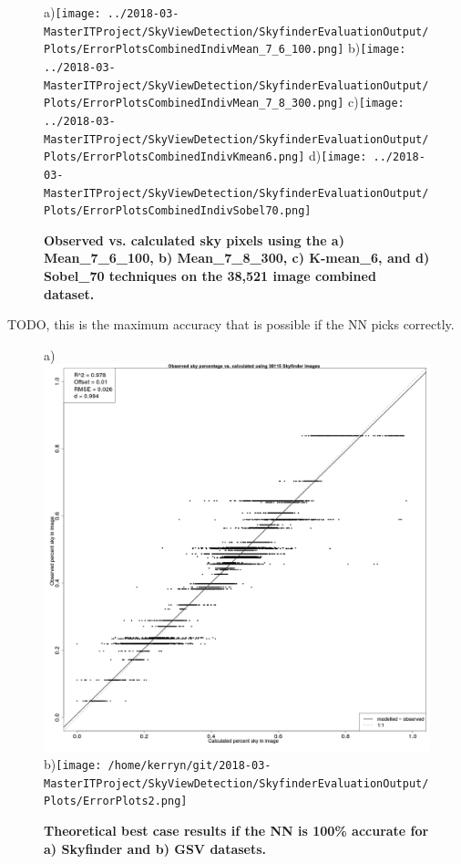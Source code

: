 \documentclass[final,3p,times,authoryear]{elsarticle}
\begin{document}
\begin{figure}
\centering
a)\texttt{[image: ../2018-03-MasterITProject/SkyViewDetection/SkyfinderEvaluationOutput/Plots/ErrorPlotsCombinedIndivMean\_7\_6\_100.png]}
b)\texttt{[image: ../2018-03-MasterITProject/SkyViewDetection/SkyfinderEvaluationOutput/Plots/ErrorPlotsCombinedIndivMean\_7\_8\_300.png]}
c)\texttt{[image: ../2018-03-MasterITProject/SkyViewDetection/SkyfinderEvaluationOutput/Plots/ErrorPlotsCombinedIndivKmean6.png]}
d)\texttt{[image: ../2018-03-MasterITProject/SkyViewDetection/SkyfinderEvaluationOutput/Plots/ErrorPlotsCombinedIndivSobel70.png]}
\caption{\textbf{Observed vs. calculated sky pixels using the a) Mean\_7\_6\_100, b) Mean\_7\_8\_300, c) K-mean\_6, and d) Sobel\_70 techniques on the 38,521 image combined dataset.} }
\label{fig:errorallcombined}
\end{figure}





TODO, this is the maximum accuracy that is possible if the NN picks correctly.
\begin{figure}
\centering
a)\includegraphics[scale=0.12]{Images/ErrorPlots.png}
b)\texttt{[image: /home/kerryn/git/2018-03-MasterITProject/SkyViewDetection/SkyfinderEvaluationOutput/Plots/ErrorPlots2.png]}
\caption{\textbf{Theoretical best case results if the NN is 100\% accurate for a) Skyfinder and b) GSV datasets.}}
\label{fig:errorplots}
\end{figure}
\end{document}

